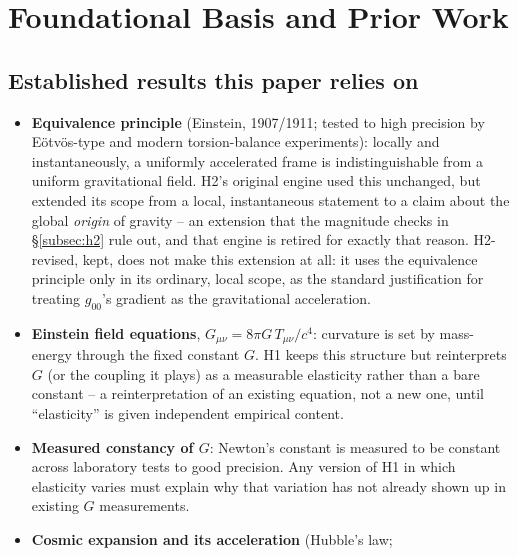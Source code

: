 \documentclass[12pt, a4paper]{article}
\begin{document}
\section{Foundational Basis and Prior Work}
\label{sec:foundations}

\subsection{Established results this paper relies on}
\begin{itemize}
  \item \textbf{Equivalence principle} (Einstein, 1907/1911; tested to
    high precision by E\"otv\"os-type and modern torsion-balance
    experiments): locally and instantaneously, a uniformly accelerated
    frame is indistinguishable from a uniform gravitational field. H2's
    original engine used this unchanged, but extended its scope from a
    local, instantaneous statement to a claim about the global
    \emph{origin} of gravity -- an extension that the magnitude checks
    in \S\ref{subsec:h2} rule out, and that engine is retired for
    exactly that reason. H2-revised, kept, does not make this
    extension at all: it uses the equivalence principle only in its
    ordinary, local scope, as the standard justification for treating
    $g_{00}$'s gradient as the gravitational acceleration.
  \item \textbf{Einstein field equations}, $G_{\mu\nu} = 8\pi G\,T_{\mu\nu}/c^4$:
    curvature is set by mass-energy through the fixed constant $G$. H1
    keeps this structure but reinterprets $G$ (or the coupling it
    plays) as a measurable elasticity rather than a bare constant --
    a reinterpretation of an existing equation, not a new one, until
    ``elasticity'' is given independent empirical content.
  \item \textbf{Measured constancy of $G$}: Newton's constant is
    measured to be constant across laboratory tests to good precision.
    Any version of H1 in which elasticity varies must explain why that
    variation has not already shown up in existing $G$ measurements.
  \item \textbf{Cosmic expansion and its acceleration} (Hubble's law;

\end{itemize}
\end{document}
